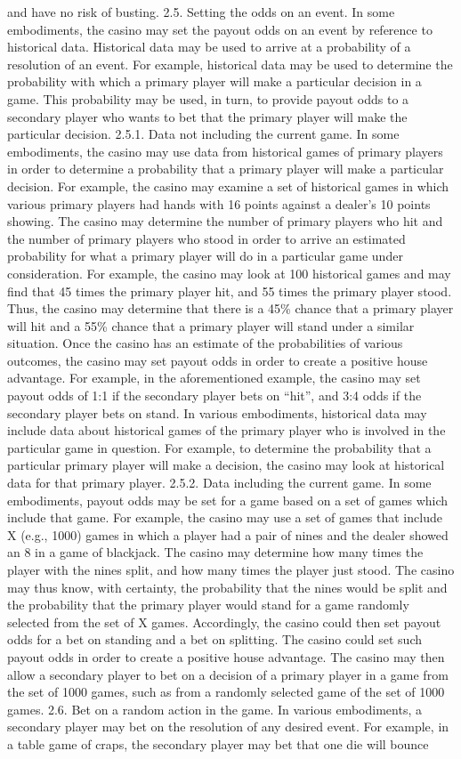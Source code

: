 \documentclass[11pt,a4paper]{article}
\begin{document}
and have no risk of busting. 2.5. Setting the odds on an event. In some embodiments, the casino may set the payout odds on an event by reference to historical data. Historical data may be used to arrive at a probability of a resolution of an event. For example, historical data may be used to determine the probability with which a primary player will make a particular decision in a game. This probability may be used, in turn, to provide payout odds to a secondary player who wants to bet that the primary player will make the particular decision. 2.5.1. Data not including the current game. In some embodiments, the casino may use data from historical games of primary players in order to determine a probability that a primary player will make a particular decision. For example, the casino may examine a set of historical games in which various primary players had hands with 16 points against a dealer's 10 points showing. The casino may determine the number of primary players who hit and the number of primary players who stood in order to arrive an estimated probability for what a primary player will do in a particular game under consideration. For example, the casino may look at 100 historical games and may find that 45 times the primary player hit, and 55 times the primary player stood. Thus, the casino may determine that there is a 45\% chance that a primary player will hit and a 55\% chance that a primary player will stand under a similar situation. Once the casino has an estimate of the probabilities of various outcomes, the casino may set payout odds in order to create a positive house advantage. For example, in the aforementioned example, the casino may set payout odds of 1:1 if the secondary player bets on “hit”, and 3:4 odds if the secondary player bets on stand. In various embodiments, historical data may include data about historical games of the primary player who is involved in the particular game in question. For example, to determine the probability that a particular primary player will make a decision, the casino may look at historical data for that primary player. 2.5.2. Data including the current game. In some embodiments, payout odds may be set for a game based on a set of games which include that game. For example, the casino may use a set of games that include X (e.g., 1000) games in which a player had a pair of nines and the dealer showed an 8 in a game of blackjack. The casino may determine how many times the player with the nines split, and how many times the player just stood. The casino may thus know, with certainty, the probability that the nines would be split and the probability that the primary player would stand for a game randomly selected from the set of X games. Accordingly, the casino could then set payout odds for a bet on standing and a bet on splitting. The casino could set such payout odds in order to create a positive house advantage. The casino may then allow a secondary player to bet on a decision of a primary player in a game from the set of 1000 games, such as from a randomly selected game of the set of 1000 games. 2.6. Bet on a random action in the game. In various embodiments, a secondary player may bet on the resolution of any desired event. For example, in a table game of craps, the secondary player may bet that one die will bounce 
\end{document}
